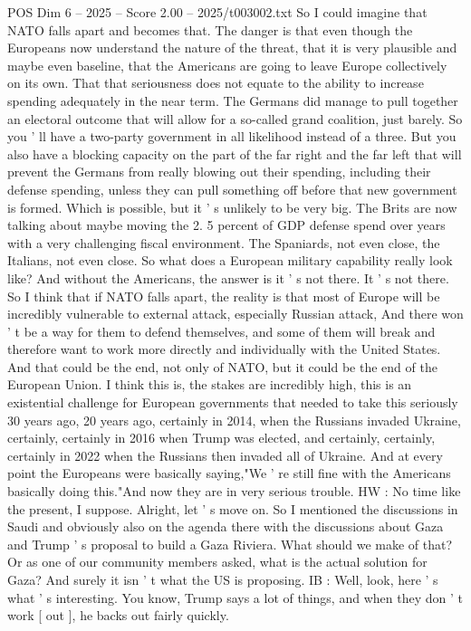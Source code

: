 \begin{textsample}{POS Dim 6 – 2025 – Score 2.00 – 2025/t003002.txt}
So I could imagine that NATO falls apart and becomes that.
The danger is that even though the Europeans now understand the nature of the threat, that it is very plausible and maybe even baseline, that the Americans are going to leave Europe collectively on its own.
That that seriousness does not equate to the ability to increase spending adequately in the near term.
The Germans did manage to pull together an electoral outcome that will allow for a so-called grand coalition, just barely.
So you ' ll have a two-party government in all likelihood instead of a three.
But you also have a blocking capacity on the part of the far right and the far left that will prevent the Germans from really blowing out their spending, including their defense spending, unless they can pull something off before that new government is formed.
Which is possible, but it ' s unlikely to be very big.
The Brits are now talking about maybe moving the 2. 5 percent of GDP defense spend over years with a very challenging fiscal environment.
The Spaniards, not even close, the Italians, not even close.
So what does a European military capability really look like?
And without the Americans, the answer is it ' s not there.
It ' s not there.
So I think that if NATO falls apart, the reality is that most of Europe will be incredibly vulnerable to external attack, especially Russian attack, And there won ' t be a way for them to defend themselves, and some of them will break and therefore want to work more directly and individually with the United States.
And that could be the end, not only of NATO, but it could be the end of the European Union.
I think this is, the stakes are incredibly high, this is an existential challenge for European governments that needed to take this seriously 30 years ago, 20 years ago, certainly in 2014, when the Russians invaded Ukraine, certainly, certainly in 2016 when Trump was elected, and certainly, certainly, certainly in 2022 when the Russians then invaded all of Ukraine.
And at every point the Europeans were basically saying,"We ' re still fine with the Americans basically doing this."And now they are in very serious trouble.
HW : No time like the present, I suppose.
Alright, let ' s move on.
So I mentioned the discussions in Saudi and obviously also on the agenda there with the discussions about Gaza and Trump ' s proposal to build a Gaza Riviera.
What should we make of that?
Or as one of our community members asked, what is the actual solution for Gaza?
And surely it isn ' t what the US is proposing.
IB : Well, look, here ' s what ' s interesting.
You know, Trump says a lot of things, and when they don ' t work [ out ], he backs out fairly quickly.

\end{textsample}
